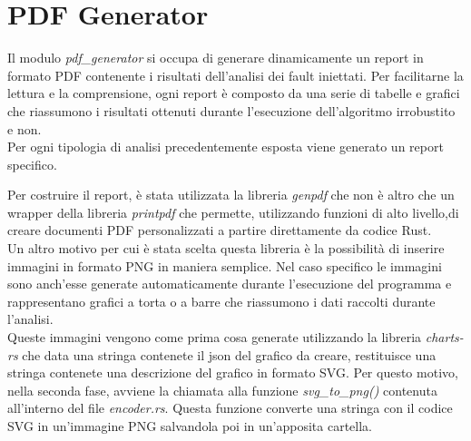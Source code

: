\section{PDF Generator}\label{sec:pdfgenerator}
Il modulo \textit{pdf\_generator} si occupa di generare dinamicamente un report in formato PDF contenente i risultati dell'analisi dei fault iniettati. Per facilitarne la lettura e la comprensione, ogni report è composto da una serie di tabelle e grafici che riassumono i risultati ottenuti durante l'esecuzione dell'algoritmo irrobustito e non.\\
Per ogni tipologia di analisi precedentemente esposta viene generato un report specifico.

Per costruire il report, è stata utilizzata la libreria \textit{genpdf} che non è altro che un wrapper della libreria \textit{printpdf} che permette, utilizzando funzioni di alto livello,di creare documenti PDF personalizzati a partire direttamente da codice Rust.\\

Un altro motivo per cui è stata scelta questa libreria è la possibilità di inserire immagini in formato PNG in maniera semplice. Nel caso specifico le immagini sono anch'esse generate automaticamente durante l'esecuzione del programma e rappresentano grafici a torta o a barre che riassumono i dati raccolti durante l'analisi.\\ 
Queste immagini vengono come prima cosa generate utilizzando la libreria \textit{charts-rs} che data una stringa contenete il json del grafico da creare, restituisce una stringa contenete una descrizione del grafico in formato SVG. Per questo motivo, nella seconda fase, avviene la chiamata alla funzione \textit{svg\_to\_png()} contenuta all'interno del file \textit{encoder.rs}. Questa funzione converte una stringa con il codice SVG in un'immagine PNG salvandola poi in un'apposita cartella.\\

